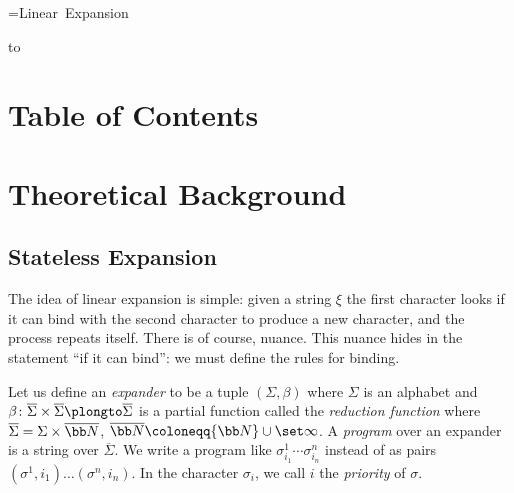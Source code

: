 




{=\hbox{Linear Expansion}
\centerline{
    \vbox{
        \smallskip
    }
}}

\bigskip
\hbox to

\section*{Table of Contents}

\tableofcontents

\vfill\break

\section{Theoretical Background}

\subsection{Stateless Expansion}

The idea of linear expansion is simple: given a string $\xi$ the first character looks if it can bind with the second character to produce a new character, and the process repeats itself.
There is of course, nuance.
This nuance hides in the statement ``if it can bind'': we must define the rules for binding.

Let us define an {\it expander} to be a tuple $(\Sigma,\beta)$ where $\Sigma$ is an alphabet and $\beta\colon\overline\Sigma\times\overline\Sigma\plongto\overline\Sigma$ is a partial function called the
{\it reduction function} where $\overline\Sigma=\Sigma\times\overline{\bb N}$, $\overline{\bb N}\coloneqq{\bb N}\cup\set\infty$.
A {\it program} over an expander is a string over $\overline\Sigma$.
We write a program like $\sigma^1_{i_1}\cdots\sigma^n_{i_n}$ instead of as pairs $(\sigma^1,i_1)\dots(\sigma^n,i_n)$.
In the character $\sigma_i$, we call $i$ the {\it priority} of $\sigma$.

